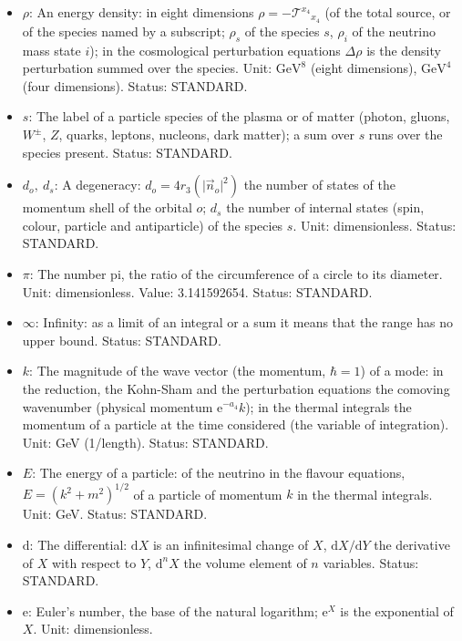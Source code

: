 \documentclass[
  10pt,
]{article}
\providecommand{\tightlist}{%
  \setlength{\itemsep}{0pt}\setlength{\parskip}{0pt}}
\begin{document}
\begin{itemize}
\tightlist
\item
  \(\rho\): An energy density: in eight dimensions
  \(\rho = -\mathcal{T}^{x_4}{}_{x_4}\) (of the total source, or of the
  species named by a subscript; \(\rho_s\) of the species \(s\),
  \(\rho_i\) of the neutrino mass state \(i\)); in the cosmological
  perturbation equations \(\Delta\rho\) is the density perturbation
  summed over the species. Unit: \(\mathrm{GeV}^{8}\) (eight
  dimensions), \(\mathrm{GeV}^{4}\) (four dimensions). Status: STANDARD.
\item
  \(s\): The label of a particle species of the plasma or of matter
  (photon, gluons, \(W^\pm\), \(Z\), quarks, leptons, nucleons, dark
  matter); a sum over \(s\) runs over the species present. Status:
  STANDARD.
\item
  \(d_o,\ d_s\): A degeneracy: \(d_o = 4r_3(\lvert\vec n_o\rvert^2)\)
  the number of states of the momentum shell of the orbital \(o\);
  \(d_s\) the number of internal states (spin, colour, particle and
  antiparticle) of the species \(s\). Unit: dimensionless. Status:
  STANDARD.
\item
  \(\pi\): The number pi, the ratio of the circumference of a circle to
  its diameter. Unit: dimensionless. Value: 3.141592654. Status:
  STANDARD.
\item
  \(\infty\): Infinity: as a limit of an integral or a sum it means that
  the range has no upper bound. Status: STANDARD.
\item
  \(k\): The magnitude of the wave vector (the momentum, \(\hbar = 1\))
  of a mode: in the reduction, the Kohn-Sham and the perturbation
  equations the comoving wavenumber (physical momentum
  \(\mathrm{e}^{-a_4}k\)); in the thermal integrals the momentum of a
  particle at the time considered (the variable of integration). Unit:
  GeV (1/length). Status: STANDARD.
\item
  \(E\): The energy of a particle: of the neutrino in the flavour
  equations, \(E = (k^2 + m^2)^{1/2}\) of a particle of momentum \(k\)
  in the thermal integrals. Unit: GeV. Status: STANDARD.
\item
  \(\mathrm{d}\): The differential: \(\mathrm{d}X\) is an infinitesimal
  change of \(X\), \(\mathrm{d}X/\mathrm{d}Y\) the derivative of \(X\)
  with respect to \(Y\), \(\mathrm{d}^nX\) the volume element of \(n\)
  variables. Status: STANDARD.
\item
  \(\mathrm{e}\): Euler's number, the base of the natural logarithm;
  \(\mathrm{e}^{X}\) is the exponential of \(X\). Unit: dimensionless.

\end{itemize}
\end{document}
